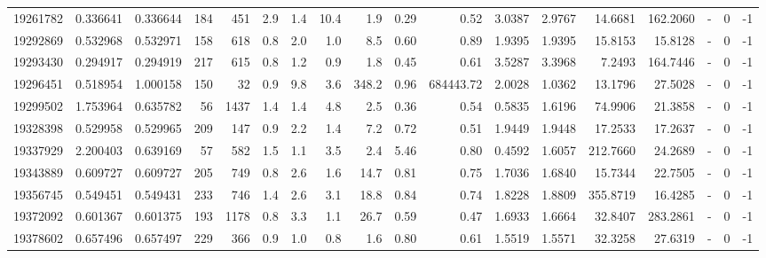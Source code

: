 \begin{tabular}{rrrrrrrrrrrrrrrlrr}
  19261782 & 0.336641 &   0.336644 &  184 &  451 &      2.9 &      1.4 &    10.4 &      1.9 &       0.29 &        0.52 &  3.0387 &  2.9767 &   14.6681 &  162.2060 &             - &        0 &         -1 \\
  19292869 & 0.532968 &   0.532971 &  158 &  618 &      0.8 &      2.0 &     1.0 &      8.5 &       0.60 &        0.89 &  1.9395 &  1.9395 &   15.8153 &   15.8128 &             - &        0 &         -1 \\
  19293430 & 0.294917 &   0.294919 &  217 &  615 &      0.8 &      1.2 &     0.9 &      1.8 &       0.45 &        0.61 &  3.5287 &  3.3968 &    7.2493 &  164.7446 &             - &        0 &         -1 \\
  19296451 & 0.518954 &   1.000158 &  150 &   32 &      0.9 &      9.8 &     3.6 &    348.2 &       0.96 &   684443.72 &  2.0028 &  1.0362 &   13.1796 &   27.5028 &             - &        0 &         -1 \\
  19299502 & 1.753964 &   0.635782 &   56 & 1437 &      1.4 &      1.4 &     4.8 &      2.5 &       0.36 &        0.54 &  0.5835 &  1.6196 &   74.9906 &   21.3858 &             - &        0 &         -1 \\
  19328398 & 0.529958 &   0.529965 &  209 &  147 &      0.9 &      2.2 &     1.4 &      7.2 &       0.72 &        0.51 &  1.9449 &  1.9448 &   17.2533 &   17.2637 &             - &        0 &         -1 \\
  19337929 & 2.200403 &   0.639169 &   57 &  582 &      1.5 &      1.1 &     3.5 &      2.4 &       5.46 &        0.80 &  0.4592 &  1.6057 &  212.7660 &   24.2689 &             - &        0 &         -1 \\
  19343889 & 0.609727 &   0.609727 &  205 &  749 &      0.8 &      2.6 &     1.6 &     14.7 &       0.81 &        0.75 &  1.7036 &  1.6840 &   15.7344 &   22.7505 &             - &        0 &         -1 \\
  19356745 & 0.549451 &   0.549431 &  233 &  746 &      1.4 &      2.6 &     3.1 &     18.8 &       0.84 &        0.74 &  1.8228 &  1.8809 &  355.8719 &   16.4285 &             - &        0 &         -1 \\
  19372092 & 0.601367 &   0.601375 &  193 & 1178 &      0.8 &      3.3 &     1.1 &     26.7 &       0.59 &        0.47 &  1.6933 &  1.6664 &   32.8407 &  283.2861 &             - &        0 &         -1 \\
  19378602 & 0.657496 &   0.657497 &  229 &  366 &      0.9 &      1.0 &     0.8 &      1.6 &       0.80 &        0.61 &  1.5519 &  1.5571 &   32.3258 &   27.6319 &             - &        0 &         -1 \\

\end{tabular}
